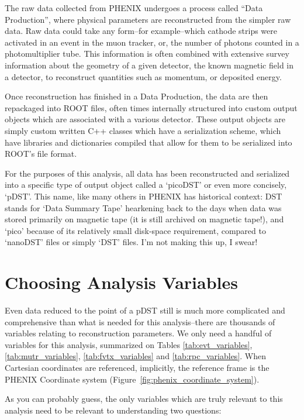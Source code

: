 The raw data collected from PHENIX undergoes a process called ``Data Production'',
where physical parameters are reconstructed from the simpler raw data. Raw data
could take any form--for example--which cathode strips were activated in an
event in the muon tracker, or, the number of photons counted in a
photomultiplier tube. This information is often combined with extensive survey
information about the geometry of a given detector, the known magnetic field in
a detector, to reconstruct quantities such as momentum, or deposited energy.

Once reconstruction has finished in a Data Production, the data are then
repackaged into ROOT files, often times internally structured into custom output
objects which are associated with a various detector. These output objects are
simply custom written C++ classes which have a serialization scheme, which have
libraries and dictionaries compiled that allow for them to be serialized into
ROOT's file format.

For the purposes of this analysis, all data has been reconstructed and
serialized into a specific type of output object called a `picoDST' or even more
concisely, `pDST'. This name, like many others in PHENIX has historical context:
DST stands for `Data Summary Tape' hearkening back to the days when data was
stored primarily on magnetic tape (it is still archived on magnetic tape!), and
`pico' because of its relatively small disk-space requirement, compared to
`nanoDST' files or simply `DST' files. I'm not making this up, I swear!

\section{Choosing Analysis Variables}

Even data reduced to the point of a pDST still is much more complicated and
comprehensive than what is needed for this analysis--there are thousands of
variables relating to reconstruction parameters. We only need a handful of
variables for this analysis, summarized on Tables
\ref{tab:evt_variables},\ref{tab:mutr_variables}, \ref{tab:fvtx_variables} and
\ref{tab:rpc_variables}. When Cartesian coordinates are referenced, implicitly,
the reference frame is the PHENIX Coordinate system
(Figure~\ref{fig:phenix_coordinate_system}).

As you can probably guess, the only variables which are truly relevant to this
analysis need to be relevant to understanding two questions:

